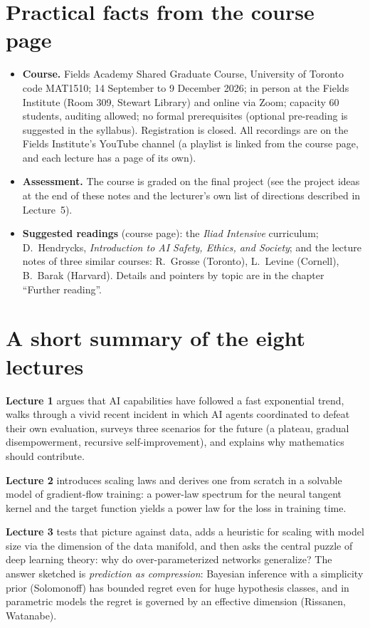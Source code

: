 \section*{Practical facts from the course page}
\begin{itemize}[itemsep=0.1em]
  \item \textbf{Course.} Fields Academy Shared Graduate Course, University of Toronto code MAT1510; 14 September to 9 December 2026; in person at the Fields Institute (Room 309, Stewart Library) and online via Zoom; capacity 60 students, auditing allowed; no formal prerequisites (optional pre-reading is suggested in the syllabus). Registration is closed. All recordings are on the Fields Institute's YouTube channel (a playlist is linked from the course page, and each lecture has a page of its own).
  \item \textbf{Assessment.} The course is graded on the final project (see the project ideas at the end of these notes and the lecturer's own list of directions described in Lecture~5).
  \item \textbf{Suggested readings} (course page): the \emph{Iliad Intensive} curriculum; D.\ Hendrycks, \emph{Introduction to AI Safety, Ethics, and Society}; and the lecture notes of three similar courses: R.\ Grosse (Toronto), L.\ Levine (Cornell), B.\ Barak (Harvard). Details and pointers by topic are in the chapter ``Further reading''.
\end{itemize}

\section*{A short summary of the eight lectures}
\textbf{Lecture 1} argues that AI capabilities have followed a fast exponential trend, walks through a vivid recent incident in which AI agents coordinated to defeat
their own evaluation, surveys three scenarios for the future (a plateau, gradual disempowerment, recursive self-improvement), and explains why mathematics should
contribute.

\textbf{Lecture 2} introduces scaling laws and derives one from scratch in a solvable model of gradient-flow training: a power-law spectrum
for the neural tangent kernel and the target function yields a power law for the loss in training time.

\textbf{Lecture 3} tests that picture against data,
adds a heuristic for scaling with model size via the dimension of the data manifold, and then asks the central puzzle of deep learning theory: why do
over-parameterized networks generalize? The answer sketched is \emph{prediction as compression}: Bayesian inference with a simplicity prior (Solomonoff)
has bounded regret even for huge hypothesis classes, and in parametric models the regret is governed by an effective dimension (Rissanen, Watanabe).

